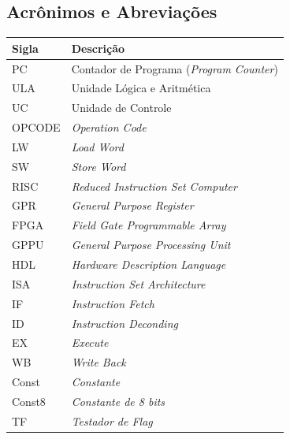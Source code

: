 \documentclass{article}
\begin{document}
  \subsection{Acrônimos e Abreviações}
    \FloatBarrier
    \begin{table}[H]
      \begin{center}
        \begin{tabular}[pos]{|m{2cm} | m{12cm}|} 
          \hline
          \cellcolor[gray]{0.9}\textbf{Sigla} & \cellcolor[gray]{0.9}\textbf{Descrição} \\ \hline
             PC       &  Contador de Programa (\textit{Program Counter})\\ \hline
             ULA      &  Unidade Lógica e Aritmética\\ \hline
             UC      &  Unidade de Controle\\ \hline
             OPCODE  &  \textit{Operation Code}\\ \hline
             LW      &  \textit{Load Word}\\ \hline
             SW      &  \textit{Store Word}\\ \hline
             RISC     & \textit{Reduced Instruction Set Computer}\\ \hline
             GPR    &   \textit{General Purpose Register}\\ \hline
             FPGA   & \textit{Field Gate Programmable Array}\\ \hline
             GPPU   & \textit{General Purpose Processing Unit}\\ \hline
             HDL    & \textit{Hardware Description Language}\\ \hline
             ISA    & \textit{Instruction Set Architecture}\\ \hline
             IF     & \textit{Instruction Fetch}\\ \hline
             ID     & \textit{Instruction Deconding}\\ \hline
             EX     & \textit{Execute}\\ \hline
             WB     & \textit{Write Back}\\ \hline
             Const  & \textit{Constante}\\ \hline
             Const8 & \textit{Constante de 8 bits}\\ \hline
             TF & \textit{Testador de Flag}\\ \hline
        \end{tabular}
      \end{center}
    \end{table}  
  
\end{document}
